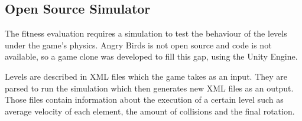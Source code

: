 \subsection{Open Source Simulator}

The fitness evaluation requires a simulation to test the behaviour of the levels under the game's physics. Angry Birds is not open source and code is not available, so a game clone was developed to fill this gap, using the Unity Engine. 

Levels are described in XML files which the game takes as an input. They are parsed to run the simulation which then generates new XML files as an output. Those files contain information about the execution of a certain level such as average velocity of each element, the amount of collisions and the final rotation. 
